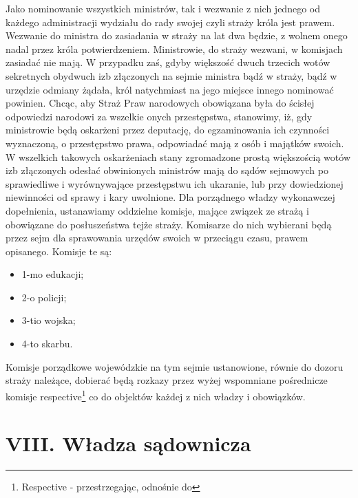 \documentclass{book}
\begin{document}
 Jako nominowanie wszystkich ministrów, tak i wezwanie z nich jednego od każdego administracji wydziału do rady swojej czyli straży króla jest prawem.  Wezwanie do ministra do zasiadania w straży na lat dwa będzie, z wolnem onego nadal przez króla potwierdzeniem.  Ministrowie, do straży wezwani, w komisjach zasiadać nie mają.  W przypadku zaś, gdyby większość dwuch trzecich wotów sekretnych obydwuch izb złączonych na sejmie ministra bądź w straży, bądź w urzędzie odmiany żądała,  król natychmiast na jego miejsce innego nominować powinien.  Chcąc, aby Straż Praw narodowych obowiązana była do ścisłej odpowiedzi narodowi za wszelkie onych przestępstwa, stanowimy, iż, gdy ministrowie będą oskarżeni przez deputację,  do egzaminowania ich czynności wyznaczoną, o przestępstwo prawa, odpowiadać mają z osób i majątków swoich.  W wszelkich takowych oskarżeniach stany zgromadzone prostą większością wotów izb złączonych odesłać obwinionych ministrów mają do sądów sejmowych po sprawiedliwe i wyrównywające przestępstwu ich ukaranie,  lub przy dowiedzionej niewinności od sprawy i kary uwolnione.  Dla porządnego władzy wykonawczej dopełnienia, ustanawiamy oddzielne komisje, mające związek ze strażą i obowiązane do posłuszeństwa tejże straży.  Komisarze do nich wybierani będą przez sejm dla sprawowania urzędów swoich w przeciągu czasu, prawem opisanego.  Komisje te są: 
\begin{itemize}
\item 1-mo edukacji; 
\item 2-o policji; 
\item 3-tio wojska; 
\item 4-to skarbu. 
\end{itemize}
Komisje porządkowe wojewódzkie na tym sejmie ustanowione, równie do dozoru straży należące, dobierać będą rozkazy przez wyżej wspomniane pośrednicze komisje respective\footnote{Respective - przestrzegając, odnośnie do} co do objektów każdej z nich władzy i obowiązków.   

 
\section*{VIII. Władza sądownicza}
\end{document}
